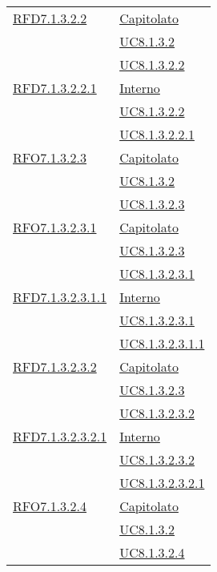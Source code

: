 \begin{longtable}{|>{\centering}m{5cm}|m{5cm}<{\centering}|}
\hyperlink{RFD7.1.3.2.2}{RFD7.1.3.2.2} & \hyperlink{Capitolato}{Capitolato}\\
& \hyperref[UC8.1.3.2]{UC8.1.3.2}\\
& \hyperref[UC8.1.3.2.2]{UC8.1.3.2.2}\\ \hline

\hyperlink{RFD7.1.3.2.2.1}{RFD7.1.3.2.2.1} & \hyperlink{Interno}{Interno}\\
& \hyperref[UC8.1.3.2.2]{UC8.1.3.2.2}\\
& \hyperref[UC8.1.3.2.2.1]{UC8.1.3.2.2.1}\\ \hline

\hyperlink{RFO7.1.3.2.3}{RFO7.1.3.2.3} & \hyperlink{Capitolato}{Capitolato}\\
& \hyperref[UC8.1.3.2]{UC8.1.3.2}\\
& \hyperref[UC8.1.3.2.3]{UC8.1.3.2.3}\\ \hline

\hyperlink{RFO7.1.3.2.3.1}{RFO7.1.3.2.3.1} & \hyperlink{Capitolato}{Capitolato}\\
& \hyperref[UC8.1.3.2.3]{UC8.1.3.2.3}\\
& \hyperref[UC8.1.3.2.3.1]{UC8.1.3.2.3.1}\\ \hline

\hyperlink{RFD7.1.3.2.3.1.1}{RFD7.1.3.2.3.1.1} & \hyperlink{Interno}{Interno}\\
& \hyperref[UC8.1.3.2.3.1]{UC8.1.3.2.3.1}\\
& \hyperref[UC8.1.3.2.3.1.1]{UC8.1.3.2.3.1.1}\\ \hline

\hyperlink{RFD7.1.3.2.3.2}{RFD7.1.3.2.3.2} & \hyperlink{Capitolato}{Capitolato}\\
& \hyperref[UC8.1.3.2.3]{UC8.1.3.2.3}\\
& \hyperref[UC8.1.3.2.3.2]{UC8.1.3.2.3.2}\\ \hline

\hyperlink{RFD7.1.3.2.3.2.1}{RFD7.1.3.2.3.2.1} & \hyperlink{Interno}{Interno}\\
& \hyperref[UC8.1.3.2.3.2]{UC8.1.3.2.3.2}\\
& \hyperref[UC8.1.3.2.3.2.1]{UC8.1.3.2.3.2.1}\\ \hline

\hyperlink{RFO7.1.3.2.4}{RFO7.1.3.2.4} & \hyperlink{Capitolato}{Capitolato}\\
& \hyperref[UC8.1.3.2]{UC8.1.3.2}\\
& \hyperref[UC8.1.3.2.4]{UC8.1.3.2.4}\\ \hline


\end{longtable}
